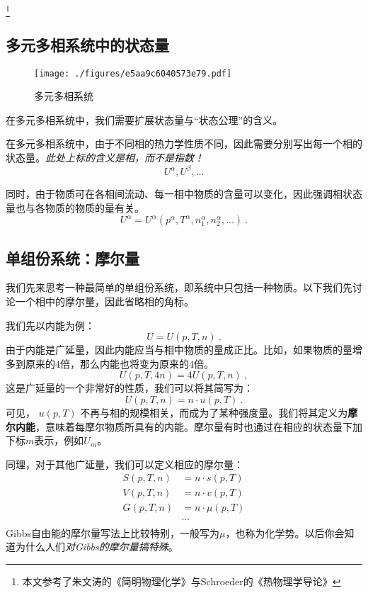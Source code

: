 
\begin{issues}
\issueDraft
\end{issues}

\footnote{本文参考了朱文涛的《简明物理化学》与Schroeder的《热物理学导论》}

\subsection{多元多相系统中的状态量}
\begin{figure}[ht]
\centering
\texttt{[image: ./figures/e5aa9c6040573e79.pdf]}
\caption{多元多相系统} \label{fig_ParMol_1}
\end{figure}

在多元多相系统中，我们需要扩展状态量与“状态公理”的含义。

在多元多相系统中，由于不同相的热力学性质不同，因此需要分别写出每一个相的状态量。\textsl{此处上标的含义是相，而不是指数！}
$$U^\alpha, U^\beta,...$$

同时，由于物质可在各相间流动、每一相中物质的含量可以变化，因此强调相状态量也与各物质的物质的量有关。
$$U^\alpha = U^\alpha (p^\alpha, T^\alpha, n_1^\alpha,n_2^\alpha,...)~.$$

\subsection{单组份系统：摩尔量}
我们先来思考一种最简单的单组份系统，即系统中只包括一种物质。以下我们先讨论一个相中的摩尔量，因此省略相的角标。

我们先以内能为例：
$$U = U (p, T, n)~.$$
由于内能是广延量，因此内能应当与相中物质的量成正比。比如，如果物质的量增多到原来的$4$倍，那么内能也将变为原来的$4$倍。
$$U(p, T, 4 n) = 4 U (p, T, n)~,$$
这是广延量的一个非常好的性质，我们可以将其简写为：
$$U(p, T, n) = n \cdot u (p, T)~.$$
可见， $u (p, T)$ 不再与相的规模相关，而成为了某种强度量。我们将其定义为\textbf{摩尔内能}，意味着每摩尔物质所具有的内能。摩尔量有时也通过在相应的状态量下加下标$m$表示，例如$U_m$。

同理，对于其他广延量，我们可以定义相应的摩尔量：
$$
\begin{aligned}
S(p, T, n) &= n \cdot s (p, T)\\
V(p, T, n) &= n \cdot v (p, T)\\
G(p, T, n) &= n \cdot \mu (p, T)\\
&...\\
\end{aligned}
$$
Gibbs自由能的摩尔量写法上比较特别，一般写为$\mu$，也称为化学势。以后你会知道为什么人们\textsl{对Gibbs的摩尔量搞特殊}。

